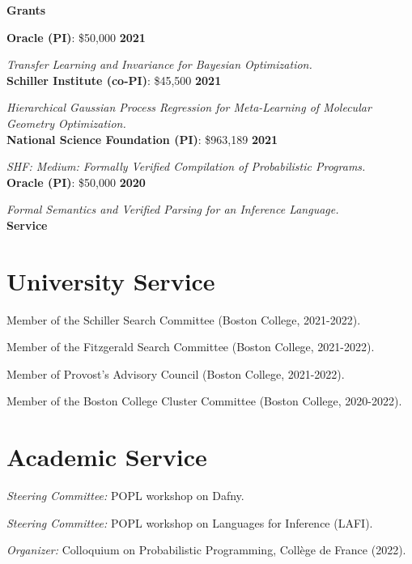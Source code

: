 \documentclass[margin,line]{res}
\begin{document}
\begin{resume}
\newpage
{\bf {\Large Grants}}

{\bf Oracle (PI)}: \$50,000 \hfill {\bf 2021}
\vspace{-.4cm}

{\em Transfer Learning and Invariance for Bayesian Optimization.} \\

{\bf Schiller Institute (co-PI)}: \$45,500 \hfill {\bf 2021}
\vspace{-.4cm}

{\em Hierarchical Gaussian Process Regression for Meta-Learning of Molecular Geometry Optimization.} \\

{\bf National Science Foundation (PI)}: \$963,189  \hfill {\bf 2021}
\vspace{-.4cm}

{\em SHF: Medium: Formally Verified Compilation of Probabilistic Programs.}\\

{\bf Oracle (PI)}: \$50,000 \hfill {\bf 2020}
\vspace{-.4cm}

{\em Formal Semantics and Verified Parsing for an Inference Language.} \\

\newpage
  {\bf {\Large Service}}

\section{\sc University Service}

Member of the Schiller Search Committee (Boston College, 2021-2022).

Member of the Fitzgerald Search Committee (Boston College, 2021-2022).

Member of Provost's Advisory Council (Boston College, 2021-2022).

Member of the Boston College Cluster Committee (Boston College, 2020-2022).

\section{\sc Academic Service}

{\em Steering Committee:} POPL workshop on Dafny.

{\em Steering Committee:} POPL workshop on Languages for Inference (LAFI).

{\em Organizer:} Colloquium on Probabilistic Programming, Coll\`ege de France (2022).


\end{resume}
\end{document}
